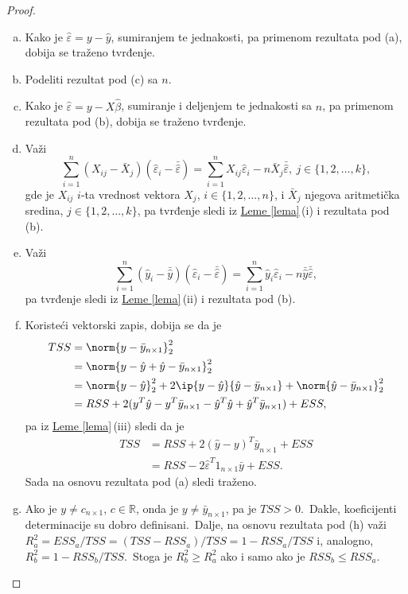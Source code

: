 \documentclass[12pt,a4paper,titlepage,oneside]{article}
\numberwithin{equation}{section}
\numberwithin{figure}{section}
\numberwithin{table}{section}
\theoremstyle{definition}
\theoremstyle{remark}
\begin{document}
\begin{appendices}
\begin{proof}
\begin{enumerate}[(a)]
		\item Kako je $\hat{\varepsilon} = y - \hat{y}$, sumiranjem te jednakosti, pa primenom rezultata pod (a), dobija se traženo tvrđenje.
		
		\item Podeliti rezultat pod (c) sa $n$.
		
		\item Kako je $\hat{\varepsilon} = y - X\hat{\beta}$, sumiranje i deljenjem te jednakosti sa $n$, pa primenom rezultata pod (b), dobija se traženo tvrđenje.
		
		\item Važi \[\sum_{i = 1}^n (X_{ij} - \bar{X}_j)(\hat{\varepsilon}_i - \bar{\hat{\varepsilon}}) = \sum_{i = 1}^n X_{ij}\hat{\varepsilon}_i - n\bar{X}_j \bar{\hat{\varepsilon}},~j\in \lbrace 1, 2, \dots , k\rbrace ,\] gde je $X_{ij}$ $i$-ta vrednost vektora  $X_j$, $i\in \lbrace 1, 2, \dots , n\rbrace$, i $\bar{X}_j$ njegova aritmetička sredina, $j\in \lbrace 1, 2, \dots , k\rbrace$, pa tvrđenje sledi iz \hyperref[lema]{Leme \ref*{lema}}\,(i) i rezultata pod (b).
		
		\item Važi \[\sum_{i = 1}^n (\hat{y}_i - \bar{\hat{y}})(\hat{\varepsilon}_i - \bar{\hat{\varepsilon}}) = \sum_{i = 1}^n \hat{y}_i\hat{\varepsilon}_i - n\bar{\hat{y}}\bar{\hat{\varepsilon}},\] pa tvrđenje sledi iz \hyperref[lema]{Leme \ref*{lema}}\,(ii) i rezultata pod (b).
		
		\item Koristeći vektorski zapis, dobija se da je
		\begin{align*}
		TSS &= \norm{y - \bar{y}_{n\times 1}}^2_2\\
		&= \norm{y - \hat{y} + \hat{y} - \bar{y}_{n\times 1}}^2_2\\
		&= \norm{y - \hat{y}}^2_2 + 2\ip{y - \hat{y}}{\hat{y} - \bar{y}_{n\times 1}} + \norm{\hat{y} - \bar{y}_{n\times 1}}^2_2\\
		&= RSS + 2(y^T \hat{y} - y^T \bar{y}_{n\times 1} - \hat{y}^T \hat{y} + \hat{y}^T \bar{y}_{n\times 1}) + ESS,
		\end{align*}
		pa iz \hyperref[lema]{Leme \ref*{lema}}\,(iii) sledi da je
		\begin{align*}
		TSS &= RSS + 2(\hat{y} - y)^T \bar{y}_{n\times 1} + ESS\\
		&= RSS - 2\hat{\varepsilon}^T 1_{n\times 1} \bar{y} + ESS.
		\end{align*}
		Sada na osnovu rezultata pod (a) sledi traženo.
		
		\item Ako je $y\neq c_{n\times 1}$, $c\in \mathbb{R}$, onda je $y\neq \bar{y}_{n\times 1}$, pa je $TSS > 0$.\ Dakle, koeficijenti determinacije su dobro definisani.\ Dalje, na osnovu rezultata pod (h) važi $R^2_a = ESS_a /TSS = (TSS - RSS_a )/TSS = 1 - RSS_a /TSS$ i, analogno, $R^2_b = 1 - RSS_b /TSS$.\ Stoga je $R^2_b \geqslant R^2_a$ ako i samo ako je $RSS_b \leqslant RSS_a$.
	\end{enumerate}
\end{proof}


\end{appendices}
\end{document}
